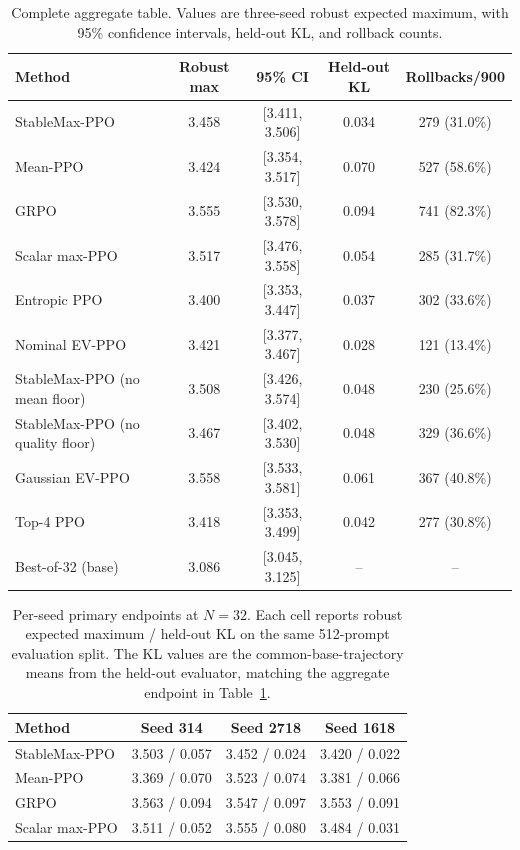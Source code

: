 \begin{table}[t]
\caption{Complete aggregate table. Values are three-seed robust expected
maximum, with 95\% confidence intervals, held-out KL, and rollback counts.}
\label{tab:full-aggregate}
\centering\footnotesize
\begin{tabular}{lcccc}
\toprule
Method & Robust max & 95\% CI & Held-out KL & Rollbacks/900\\
\midrule
StableMax-PPO & 3.458 & [3.411, 3.506] & 0.034 & 279 (31.0\%)\\
Mean-PPO & 3.424 & [3.354, 3.517] & 0.070 & 527 (58.6\%)\\
GRPO & 3.555 & [3.530, 3.578] & 0.094 & 741 (82.3\%)\\
Scalar max-PPO & 3.517 & [3.476, 3.558] & 0.054 & 285 (31.7\%)\\
Entropic PPO & 3.400 & [3.353, 3.447] & 0.037 & 302 (33.6\%)\\
Nominal EV-PPO & 3.421 & [3.377, 3.467] & 0.028 & 121 (13.4\%)\\
StableMax-PPO (no mean floor) & 3.508 & [3.426, 3.574] & 0.048 & 230 (25.6\%)\\
StableMax-PPO (no quality floor) & 3.467 & [3.402, 3.530] & 0.048 & 329 (36.6\%)\\
Gaussian EV-PPO & 3.558 & [3.533, 3.581] & 0.061 & 367 (40.8\%)\\
Top-4 PPO & 3.418 & [3.353, 3.499] & 0.042 & 277 (30.8\%)\\
Best-of-32 (base) & 3.086 & [3.045, 3.125] & -- & --\\
\bottomrule
\end{tabular}
\end{table}

\begin{table}[t]
\centering
\footnotesize
\caption{Per-seed primary endpoints at $N=32$. Each cell reports robust
expected maximum / held-out KL on the same 512-prompt evaluation split. The KL
values are the common-base-trajectory means from the held-out evaluator, matching
the aggregate endpoint in Table~\ref{tab:full-aggregate}.}
\label{tab:per-seed-primary}
\begin{tabular}{lccc}
\toprule
Method & Seed 314 & Seed 2718 & Seed 1618 \\
\midrule
StableMax-PPO & 3.503 / 0.057 & 3.452 / 0.024 & 3.420 / 0.022 \\
Mean-PPO & 3.369 / 0.070 & 3.523 / 0.074 & 3.381 / 0.066 \\
GRPO & 3.563 / 0.094 & 3.547 / 0.097 & 3.553 / 0.091 \\
Scalar max-PPO & 3.511 / 0.052 & 3.555 / 0.080 & 3.484 / 0.031 \\
\bottomrule
\end{tabular}
\end{table}


